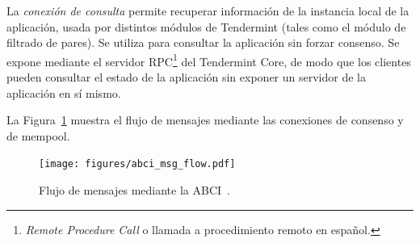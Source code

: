 %

La \textit{conexión de consulta} permite recuperar información de la instancia local de la aplicación, usada
por distintos módulos de Tendermint (tales como el módulo de filtrado de pares).
%
Se utiliza para consultar la aplicación sin forzar consenso.
%
Se expone mediante el servidor RPC\footnote{\textit{Remote Procedure Call} o llamada a procedimiento
remoto en español.} del Tendermint Core, de modo que los clientes pueden
consultar el estado de la aplicación sin exponer un servidor de la aplicación en sí mismo. 

La Figura~\ref{fig:abci_flow} muestra el flujo de mensajes mediante las conexiones de consenso y de mempool.

\begin{figure}
  \centering
  \texttt{[image: figures/abci\_msg\_flow.pdf]}
  \caption{Flujo de mensajes mediante la ABCI~\cite{tendermint.site}.}
  \label{fig:abci_flow}
\end{figure}

